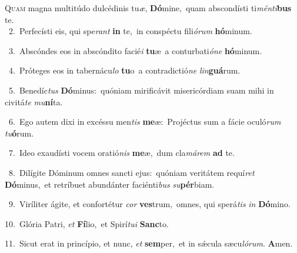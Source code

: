 \lettrine{\initial\textcolor{\initialcolor}{Q}}{uam} magna multitúdo dulcédinis tu\-\textit{æ}\-, \textbf{Dó}\-mine,~\star quam abscondísti ti\-\textit{mén}\-\textit{ti}\textbf{bus} te.\\
{\numbfont\textcolor{\numbcolor}{~2.}}~Perfecísti eis, qui spe\textit{rant} \textbf{in} te,~\star in conspéctu fili\-\textit{ó}\-\textit{rum} \textbf{hó}\-minum.\par
{\numbfont\textcolor{\numbcolor}{~3.}}~Abscóndes eos in abscóndito facié\textit{i} \textbf{tu}\-æ~\star a conturbati\-\textit{ó}\-\textit{ne} \textbf{hó}\-minum.\par
{\numbfont\textcolor{\numbcolor}{~4.}}~Próteges eos in tabernácu\textit{lo} \textbf{tu}\-o~\star a contradictió\textit{ne} \textit{lin}\-\textbf{guá}rum.\par
{\numbfont\textcolor{\numbcolor}{~5.}}~Benedíc\textit{tus} \textbf{Dó}\-minus:~\star quóniam mirificávit misericórdiam suam mihi in civitá\textit{te} \textit{mu}\-\textbf{ní}ta.\par
{\numbfont\textcolor{\numbcolor}{~6.}}~Ego autem dixi in excéssu men\textit{tis} \textbf{me}\-æ:~\star Projéctus sum a fácie oculó\textit{rum} \textit{tu}\-\textbf{ó}rum.\par
{\numbfont\textcolor{\numbcolor}{~7.}}~Ideo exaudísti vocem oratió\textit{nis} \textbf{me}\-æ,~\star dum cla\-\textit{má}\-\textit{rem} \textbf{ad} te.\par
{\numbfont\textcolor{\numbcolor}{~8.}}~Dilígite Dóminum omnes sancti ejus:~\dagger quóniam veritátem requí\textit{ret} \textbf{Dó}\-minus,~\star et retríbuet abundánter faciénti\textit{bus} \textit{su}\-\textbf{pér}biam.\par
{\numbfont\textcolor{\numbcolor}{~9.}}~Viríliter ágite, et confortétur \textit{cor} \textbf{ves}\-trum,~\star omnes, qui sperá\textit{tis} \textit{in} \textbf{Dó}\-mino.\par
{\numbfont\textcolor{\numbcolor}{10.}}~Glória Patri, \textit{et} \textbf{Fí}\-lio,~\star et Spirí\-\textit{tu}\-\textit{i} \textbf{Sanc}\-to.\par
{\numbfont\textcolor{\numbcolor}{11.}}~Sicut erat in princípio, et nunc, \textit{et} \textbf{sem}\-per,~\star et in sǽcula sæcu\-\textit{ló}\-\textit{rum}. \textbf{A}\-men.\par

